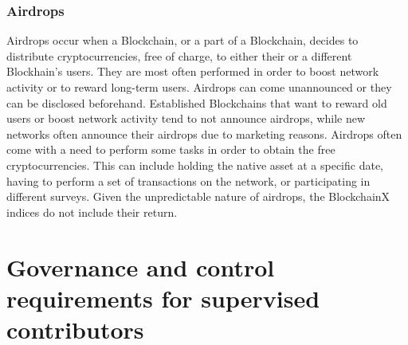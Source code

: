 \documentclass{article}
\begin{document}
\subsubsection{Airdrops}

Airdrops occur when a Blockchain, or a part of a Blockchain, decides to distribute cryptocurrencies, free of charge, to either their or a different Blockhain’s users. They are most often performed in order to boost network activity or to reward long-term users. Airdrops can come unannounced or they can be disclosed beforehand. Established Blockchains that want to reward old users or boost network activity tend to not announce airdrops, while new networks often announce their airdrops due to marketing reasons. Airdrops often come with a need to perform some tasks in order to obtain the free cryptocurrencies. This can include holding the native asset at a specific date, having to perform a set of transactions on the network, or participating in different surveys. Given the unpredictable nature of airdrops, the BlockchainX indices do not include their return. 







\section{Governance and control requirements for supervised contributors}
\end{document}
